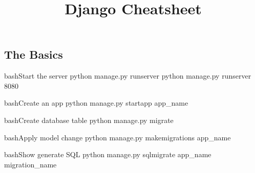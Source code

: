 \documentclass[10pt,a4paper]{article}
\title{\color{w3schools}Django Cheatsheet
}
\begin{document}
\maketitle
\small
\begin{multicols}{3}

\thispagestyle{empty}
\scriptsize

% 




{\centering\section{The Basics}}

\begin{codebox}{bash}{Start the server}
python manage.py runserver
python manage.py runserver 8080

\end{codebox}

\begin{codebox}{bash}{Create an app}
python manage.py startapp app_name

\end{codebox}

\begin{codebox}{bash}{Create database table}
python manage.py migrate

\end{codebox}

\begin{codebox}{bash}{Apply model change}
python manage.py makemigrations app_name

\end{codebox}

\begin{codebox}{bash}{Show generate SQL}
python manage.py sqlmigrate app_name migration_name


\end{codebox}
\end{multicols}
\end{document}
